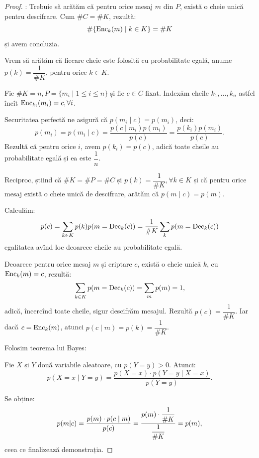 \begin{proof}
  \qq{$\Longrightarrow$}: Trebuie să arătăm că pentru orice mesaj $ m $ din $ P $,
  există o cheie unică pentru descifrare. Cum $ \# C = \# K $, rezultă:
  \[
    \# \{ \mathrm{Enc}_k(m) \mid k \in K \} = \# K
  \]
  și avem concluzia.

  Vrem să arătăm că fiecare cheie este folosită cu probabilitate egală,
  anume $ p(k) = \dfrac{1}{\# K} $, pentru orice $ k \in K $.

  Fie $ \# K = n, P = \{ m_i \mid 1 \leq i \leq n \} $ și fie $ c \in C $ fixat.
  Indexăm cheile $ k_1, \dots, k_n $ astfel încît $ \mathrm{Enc}_{k_i}(m_i) = c, \forall i $.

  Securitatea perfectă ne asigură că $ p(m_i \mid c) = p(m_i) $, deci:
  \[
    p(m_i) = p(m_i \mid c) = \frac{p(c\mid m_i) p(m_i)}{p(c)} = %
    \frac{p(k_i)p(m_i)}{p(c)}.
  \]
  Rezultă că pentru orice $ i $, avem $ p(k_i) = p(c) $, adică toate cheile
  au probabilitate egală și ea este $ \dfrac{1}{n} $.

  \qq{$\Longleftarrow$} Reciproc, știind că $ \# K = \# P = \# C $ și
  $ p(k) = \dfrac{1}{\# K}, \forall k \in K $ și că pentru orice mesaj
  există o cheie unică de descifrare, arătăm că $ p(m \mid c) = p(m) $.

  Calculăm:
  \[
    p(c) = \sum_{k \in K} p(k) p(m = \dr{Dec}_k(c)) = %
    \frac{1}{\# K} \sum_k p(m = \dr{Dec}_k(c))
  \]
egalitatea avînd loc deoarece cheile au probabilitate egală.

Deoarece pentru orice mesaj $ m $ și criptare $ c $, există o
cheie unică $ k $, cu $ \mathrm{Enc}_k(m) = c $, rezultă:
\[
  \sum_{k \in K} p(m = \mathrm{Dec}_k(c)) = \sum_m p(m) = 1,
\]
adică, încercînd toate cheile, sigur descifrăm mesajul.
Rezultă $ p(c) = \dfrac{1}{\# K} $. Iar dacă $ c = \mathrm{Enc}_k(m) $,
atunci $ p(c \mid m) = p(k) = \dfrac{1}{\# K} $.

Folosim teorema lui Bayes:
\begin{theorem}[Bayes]\label{thm:bayes}
  Fie $ X $ și $ Y $ două variabile aleatoare, cu $ p(Y = y) > 0 $. Atunci:
  \[
    p(X = x \mid Y = y) = \frac{p(X = x) \cdot p(Y = y \mid X = x)}{p(Y = y)}.
  \]
\end{theorem}

Se obține:
\[
  p(m | c) = \dfrac{p(m) \cdot p(c \mid m)}{p(c)} = \dfrac{p(m) \cdot \dfrac{1}{\# K}}{%
    \dfrac{1}{\# K}} = p(m),
\]
ceea ce finalizează demonstrația.
\end{proof}


